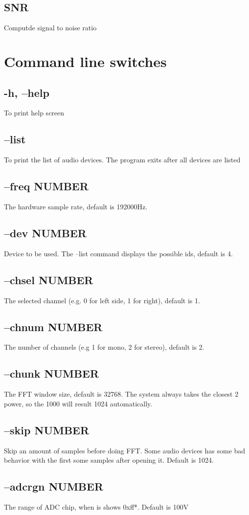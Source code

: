 \documentclass[10pt,a4paper]{article}
\begin{document}
\subsection{SNR}
Computde signal to noise ratio
\section{Command line switches}
\subsection{-h, --help}
To print help screen
\subsection{--list}
To print the list of audio devices. The program exits after all devices are listed
\subsection{--freq NUMBER}
The hardware sample rate, default is 192000Hz.
\subsection{--dev NUMBER}
Device to be used. The --list command displays the possible ids, default is 4. 
\subsection{--chsel NUMBER}
The selected channel (e.g. 0 for left side, 1 for right), default is 1.
\subsection{--chnum NUMBER}
The number of channels (e.g 1 for mono, 2 for stereo), default is 2.
\subsection{--chunk NUMBER}
The FFT window size, default is 32768. The system always takes the closest 2 power, so the 1000 will result 1024 automatically.
\subsection{--skip NUMBER}
Skip an amount of samples before doing FFT. Some audio devices has some bad behavior with the first some samples after opening it. Default is 1024.
\subsection{--adcrgn NUMBER}
The range of ADC chip, when is shows 0xff*. Default is 100V
\end{document}
